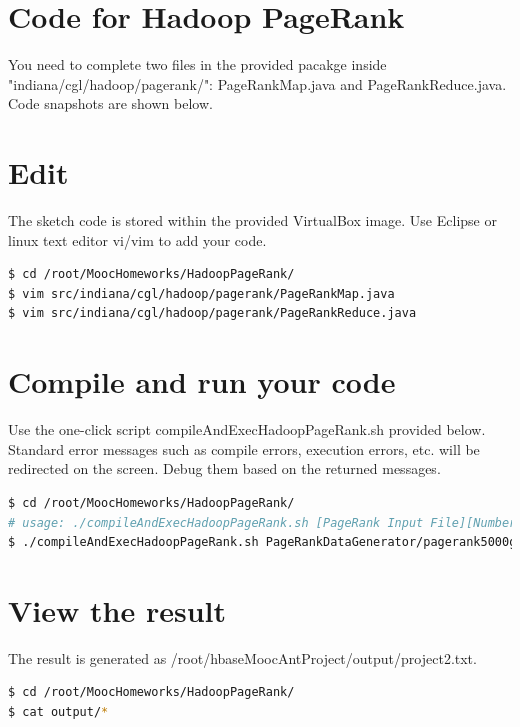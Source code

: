 \section*{Code for Hadoop PageRank}

You need to complete two files in the provided pacakge inside
"indiana/cgl/hadoop/pagerank/": PageRankMap.java and PageRankReduce.java. Code
snapshots are shown below.




\section*{Edit}
The sketch code is stored within the provided VirtualBox image. Use Eclipse or
linux text editor vi/vim to add your code.

\begin{lstlisting}[language=bash]
$ cd /root/MoocHomeworks/HadoopPageRank/
$ vim src/indiana/cgl/hadoop/pagerank/PageRankMap.java
$ vim src/indiana/cgl/hadoop/pagerank/PageRankReduce.java
\end{lstlisting}

\section*{Compile and run your code}
Use the one-click script compileAndExecHadoopPageRank.sh provided below.
Standard error messages such as compile errors, execution errors, etc. will be
redirected on the screen. Debug them based on the returned messages.

\begin{lstlisting}[language=bash]
$ cd /root/MoocHomeworks/HadoopPageRank/
# usage: ./compileAndExecHadoopPageRank.sh [PageRank Input File][Number of Urls][Number Of Iterations]
$ ./compileAndExecHadoopPageRank.sh PageRankDataGenerator/pagerank5000g50.input.0 5000 1
\end{lstlisting}

\section*{View the result}
The result is generated as /root/hbaseMoocAntProject/output/project2.txt. 
\begin{lstlisting}[language=bash]
$ cd /root/MoocHomeworks/HadoopPageRank/
$ cat output/*
\end{lstlisting}
